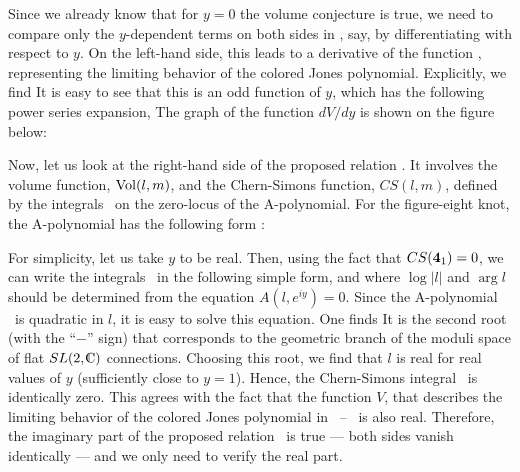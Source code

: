 Since we already know that for $y=0$ the volume conjecture is true,
we need to compare only the $y$-dependent terms on both
sides in \generalconj, say, by differentiating with
respect to $y$. On the left-hand side, this leads to
a derivative of the function \vfunction, representing
the limiting behavior of the colored Jones polynomial.
Explicitly, we find
%
\eqn{}
%
It is easy to see that this is an odd function of $y$,
which has the following power series expansion,
%
\eqn{}
%
The graph of the function $dV/dy$ is shown on the figure below:

\ifig{}
{}

Now, let us look at the right-hand side of the proposed
relation \generalconj. It involves the volume function, ${\rm Vol} (l,m)$,
and the Chern-Simons function, $CS(l,m)$, defined by the integrals
\csvolint\  on the zero-locus of the A-polynomial.
For the figure-eight knot, the A-polynomial has
the following form \CCGLS:
%
\eqn{}
%

For simplicity, let us take $y$ to be real.
Then, using the fact that $CS({\bf 4}_1)=0$, we can write
the integrals \csvolint\ in the following simple form,
%
\eqn{}
%
and
%
\eqn{}
%
where $\log |l|$ and $\arg l$ should be determined from
the equation $A (l,e^{iy})=0$.
Since the A-polynomial \apolyeight\ is quadratic in $l$,
it is easy to solve this equation. One finds
%
\eqn{}
%
It is the second root (with the ``$-$'' sign) that corresponds
to the geometric branch of the moduli space of flat $SL(2,\IC)$
connections. Choosing this root, we find that $l$ is real
for real values of $y$ (sufficiently close to $y = 1$).
Hence, the Chern-Simons integral \cseightint\ is identically zero.
This agrees with the fact that the function $V$, that describes
the limiting behavior of the colored Jones polynomial
in \limiteight\ -- \vfunction\ is also real.
Therefore, the imaginary part of the proposed relation \generalconj\
is true --- both sides vanish identically --- and we only need
to verify the real part.

